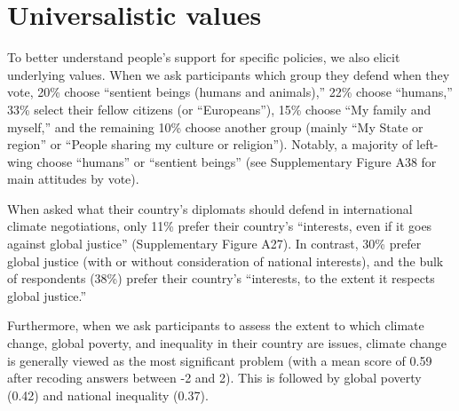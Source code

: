 \documentclass{nature}
\begin{document}
\section{Universalistic values}\label{subsec:universalistic}

To better understand people's support for specific policies, we also elicit underlying values. %
When we ask participants which group they defend when they vote, %
20\% choose ``sentient beings (humans and animals),'' 22\% choose ``humans,'' 33\% select their fellow citizens (or ``Europeans''), 15\% choose ``My family and myself,'' and the remaining 10\% choose another group (mainly ``My State or region'' or ``People sharing my culture or religion''). 
Notably, a majority of left-wing choose ``humans'' or ``sentient beings'' 
(see Supplementary Figure A38 for main attitudes by vote).%

When asked what their country's diplomats should defend in international climate negotiations, only 11\% prefer their country's ``interests, even if it goes against global justice'' (Supplementary Figure A27). In contrast, 30\% prefer global justice (with or without consideration of national interests), and the bulk of respondents (38\%) prefer their country's ``interests, to the extent it respects global justice.''

Furthermore, when we ask participants to assess the extent to which climate change, global poverty, and inequality in their country are issues, climate change is generally viewed as the most significant problem (with a mean score of 0.59 after recoding answers between -2 and 2). This is followed by global poverty (0.42) and national inequality (0.37). %
\end{document}
